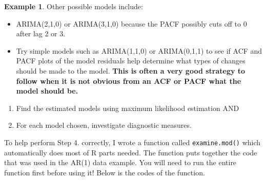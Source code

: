 \documentclass[
]{book}
\newenvironment{Shaded}{\begin{snugshade}}{\end{snugshade}}
\newcommand{\AttributeTok}[1]{\textcolor[rgb]{0.77,0.63,0.00}{#1}}
\newcommand{\CommentTok}[1]{\textcolor[rgb]{0.56,0.35,0.01}{\textit{#1}}}
\newcommand{\ControlFlowTok}[1]{\textcolor[rgb]{0.13,0.29,0.53}{\textbf{#1}}}
\newcommand{\DecValTok}[1]{\textcolor[rgb]{0.00,0.00,0.81}{#1}}
\newcommand{\FunctionTok}[1]{\textcolor[rgb]{0.00,0.00,0.00}{#1}}
\newcommand{\NormalTok}[1]{#1}
\newcommand{\OtherTok}[1]{\textcolor[rgb]{0.56,0.35,0.01}{#1}}
\newcommand{\SpecialCharTok}[1]{\textcolor[rgb]{0.00,0.00,0.00}{#1}}
\newcommand{\StringTok}[1]{\textcolor[rgb]{0.31,0.60,0.02}{#1}}
\providecommand{\tightlist}{%
  \setlength{\itemsep}{0pt}\setlength{\parskip}{0pt}}
\theoremstyle{definition}
\theoremstyle{definition}
\newtheorem{example}{Example}[chapter]
\theoremstyle{definition}
\theoremstyle{definition}
\theoremstyle{remark}
\begin{document}
\begin{example}
Other possible models include:

\begin{itemize}
\tightlist
\item
  ARIMA(2,1,0) or ARIMA(3,1,0) because the PACF possibly cuts off to 0 after lag 2 or 3.
\item
  Try simple models such as ARIMA(1,1,0) or ARIMA(0,1,1) to see if ACF and PACF plots of the model residuals help determine what types of changes should be made to the model. \textbf{This is often a very good strategy to follow when it is not obvious from an ACF or PACF what the model should be.}
\end{itemize}

\begin{enumerate}
\def\labelenumi{\arabic{enumi}.}
\setcounter{enumi}{2}
\item
  Find the estimated models using maximum likelihood estimation AND
\item
  For each model chosen, investigate diagnostic measures.
\end{enumerate}

To help perform Step 4. correctly, I wrote a function called \texttt{examine.mod()} which automatically does most of R parts needed. The function puts together the code that was used in the AR(1) data example. You will need to run the entire function first before using it! Below is the codes of the function.

\begin{Shaded}
\end{Shaded}
\end{example}
\end{document}
